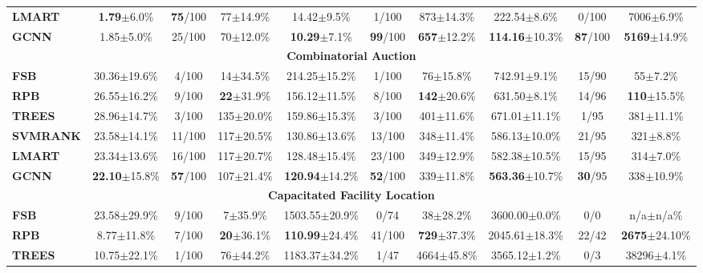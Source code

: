 \begin{table*}[htb!]
\begin{footnotesize}
\begin{tabular}{|l c c c c c c c c c|}
        \textbf{LMART} & \textbf{1.79}$\pm$6.0\% & \textbf{75}/100 & 77$\pm$14.9\% & 14.42$\pm$9.5\% & 1/100 & 873$\pm$14.3\% & 222.54$\pm$8.6\% & 0/100 & 7006$\pm$6.9\%\\
        \textbf{GCNN} & 1.85$\pm$5.0\% & 25/100 & 70$\pm$12.0\% & \textbf{10.29}$\pm$7.1\% & \textbf{99}/100 & \textbf{657}$\pm$12.2\% & \textbf{114.16}$\pm$10.3\% & \textbf{87}/100 & \textbf{5169}$\pm$14.9\%\\
        \multicolumn{10}{|c|}{\textbf{Combinatorial Auction}}\\
        \hline
        \textbf{FSB} & 30.36$\pm$19.6\% & 4/100 & 14$\pm$34.5\% & 214.25$\pm$15.2\% & 1/100 & 76$\pm$15.8\% & 742.91$\pm$9.1\% & 15/90 & 55$\pm$7.2\%\\
        \textbf{RPB} & 26.55$\pm$16.2\% & 9/100 & \textbf{22}$\pm$31.9\% & 156.12$\pm$11.5\% & 8/100 & \textbf{142}$\pm$20.6\% & 631.50$\pm$8.1\% & 14/96 & \textbf{110}$\pm$15.5\%\\
        \textbf{TREES} & 28.96$\pm$14.7\% & 3/100 & 135$\pm$20.0\% & 159.86$\pm$15.3\% & 3/100 & 401$\pm$11.6\% & 671.01$\pm$11.1\% & 1/95 & 381$\pm$11.1\%\\
        \textbf{SVMRANK} & 23.58$\pm$14.1\% & 11/100 & 117$\pm$20.5\% & 130.86$\pm$13.6\% & 13/100 & 348$\pm$11.4\% & 586.13$\pm$10.0\% & 21/95 & 321$\pm$8.8\%\\
        \textbf{LMART} & 23.34$\pm$13.6\% & 16/100 & 117$\pm$20.7\% & 128.48$\pm$15.4\% & 23/100 & 349$\pm$12.9\% & 582.38$\pm$10.5\% & 15/95 & 314$\pm$7.0\%\\
        \textbf{GCNN} & \textbf{22.10}$\pm$15.8\% & \textbf{57}/100 & 107$\pm$21.4\% & \textbf{120.94}$\pm$14.2\% & \textbf{52}/100 & 339$\pm$11.8\% & \textbf{563.36}$\pm$10.7\% & \textbf{30}/95 & 338$\pm$10.9\%\\
        \multicolumn{10}{|c|}{\textbf{Capacitated Facility Location}}\\
        \hline
        \textbf{FSB} & 23.58$\pm$29.9\% & 9/100 & 7$\pm$35.9\% & 1503.55$\pm$20.9\% & 0/74 & 38$\pm$28.2\% & 3600.00$\pm$0.0\% & 0/0 & n/a$\pm$n/a\%\\
        \textbf{RPB} & 8.77$\pm$11.8\% & 7/100 & \textbf{20}$\pm$36.1\% & \textbf{110.99}$\pm$24.4\% & 41/100 & \textbf{729}$\pm$37.3\% & 2045.61$\pm$18.3\% & 22/42 & \textbf{2675}$\pm$24.10\%\\
        \textbf{TREES} & 10.75$\pm$22.1\% & 1/100 & 76$\pm$44.2\% & 1183.37$\pm$34.2\% & 1/47 & 4664$\pm$45.8\% & 3565.12$\pm$1.2\% & 0/3 & 38296$\pm$4.1\%\\

\end{tabular}
\end{footnotesize}
\end{table*}
